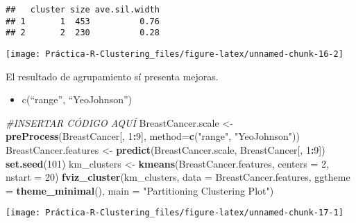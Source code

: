 \documentclass[
]{article}
\newenvironment{Shaded}{\begin{snugshade}}{\end{snugshade}}
\newcommand{\CommentTok}[1]{\textcolor[rgb]{0.56,0.35,0.01}{\textit{#1}}}
\newcommand{\DataTypeTok}[1]{\textcolor[rgb]{0.13,0.29,0.53}{#1}}
\newcommand{\DecValTok}[1]{\textcolor[rgb]{0.00,0.00,0.81}{#1}}
\newcommand{\KeywordTok}[1]{\textcolor[rgb]{0.13,0.29,0.53}{\textbf{#1}}}
\newcommand{\NormalTok}[1]{#1}
\newcommand{\OperatorTok}[1]{\textcolor[rgb]{0.81,0.36,0.00}{\textbf{#1}}}
\newcommand{\StringTok}[1]{\textcolor[rgb]{0.31,0.60,0.02}{#1}}
\providecommand{\tightlist}{%
  \setlength{\itemsep}{0pt}\setlength{\parskip}{0pt}}
\begin{document}
\begin{verbatim}
##   cluster size ave.sil.width
## 1       1  453          0.76
## 2       2  230          0.28
\end{verbatim}

\begin{center}\texttt{[image: Práctica-R-Clustering\_files/figure-latex/unnamed-chunk-16-2]} \end{center}

El resultado de agrupamiento sí presenta mejoras.

\begin{itemize}
\tightlist
\item
  c(``range'', ``YeoJohnson'')
\end{itemize}

\begin{Shaded}
\begin{Highlighting}[]
\CommentTok{#INSERTAR CÓDIGO AQUÍ}
\NormalTok{BreastCancer.scale <-}\StringTok{ }\KeywordTok{preProcess}\NormalTok{(BreastCancer[, }\DecValTok{1}\OperatorTok{:}\DecValTok{9}\NormalTok{], }\DataTypeTok{method=}\KeywordTok{c}\NormalTok{(}\StringTok{"range"}\NormalTok{, }\StringTok{"YeoJohnson"}\NormalTok{))}
\NormalTok{BreastCancer.features <-}\StringTok{ }\KeywordTok{predict}\NormalTok{(BreastCancer.scale, BreastCancer[, }\DecValTok{1}\OperatorTok{:}\DecValTok{9}\NormalTok{])}
\KeywordTok{set.seed}\NormalTok{(}\DecValTok{101}\NormalTok{)}
\NormalTok{km_clusters <-}\StringTok{ }\KeywordTok{kmeans}\NormalTok{(BreastCancer.features, }\DataTypeTok{centers =} \DecValTok{2}\NormalTok{, }\DataTypeTok{nstart =} \DecValTok{20}\NormalTok{)}
\KeywordTok{fviz_cluster}\NormalTok{(km_clusters, }\DataTypeTok{data =}\NormalTok{ BreastCancer.features,}
             \DataTypeTok{ggtheme =} \KeywordTok{theme_minimal}\NormalTok{(),}
             \DataTypeTok{main =} \StringTok{"Partitioning Clustering Plot"}\NormalTok{)}
\end{Highlighting}
\end{Shaded}

\begin{center}\texttt{[image: Práctica-R-Clustering\_files/figure-latex/unnamed-chunk-17-1]} \end{center}

\begin{Shaded}
\end{Shaded}
\end{document}
